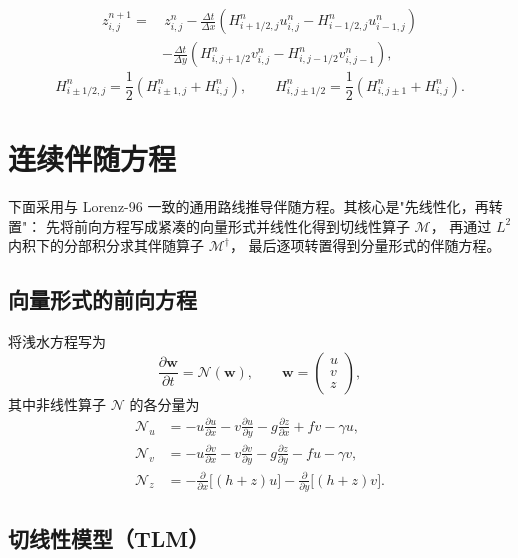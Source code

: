 \documentclass[12pt,a4paper,twoside]{article}
\begin{document}
\begin{align}
z_{i,j}^{n+1} = &\, z_{i,j}^{n}
- \frac{\Delta t}{\Delta x}
\left(
H_{i+1/2,j}^{n} u_{i,j}^{n} - H_{i-1/2,j}^{n} u_{i-1,j}^{n}
\right) \nonumber \\
&- \frac{\Delta t}{\Delta y}
\left(
H_{i,j+1/2}^{n} v_{i,j}^{n} - H_{i,j-1/2}^{n} v_{i,j-1}^{n}
\right),
\end{align}
\[
H_{i\pm1/2,j}^{n} = \frac{1}{2}(H_{i\pm1,j}^{n}+H_{i,j}^{n}),
\qquad
H_{i,j\pm1/2}^{n} = \frac{1}{2}(H_{i,j\pm1}^{n}+H_{i,j}^{n}).
\]

\section{连续伴随方程}


下面采用与 Lorenz-96 一致的通用路线推导伴随方程。其核心是"先线性化，再转置"：
先将前向方程写成紧凑的向量形式并线性化得到切线性算子 $\mathcal{M}$，
再通过 $L^2$ 内积下的分部积分求其伴随算子 $\mathcal{M}^\dagger$，
最后逐项转置得到分量形式的伴随方程。

\subsection{向量形式的前向方程}

将浅水方程写为
\begin{equation}
    \frac{\partial \mathbf{w}}{\partial t} = \mathcal{N}(\mathbf{w}), \qquad
    \mathbf{w} = \begin{pmatrix} u \\ v \\ z \end{pmatrix},
\end{equation}
其中非线性算子 $\mathcal{N}$ 的各分量为
\begin{align}
    \mathcal{N}_u &= -u\frac{\partial u}{\partial x} - v\frac{\partial u}{\partial y} - g\frac{\partial z}{\partial x} + fv - \gamma u, \label{eq:vec_nu} \\
    \mathcal{N}_v &= -u\frac{\partial v}{\partial x} - v\frac{\partial v}{\partial y} - g\frac{\partial z}{\partial y} - fu - \gamma v, \label{eq:vec_nv} \\
    \mathcal{N}_z &= -\frac{\partial}{\partial x}\big[(h+z)u\big] - \frac{\partial}{\partial y}\big[(h+z)v\big]. \label{eq:vec_nz}
\end{align}

\subsection{切线性模型（TLM）}
\end{document}
